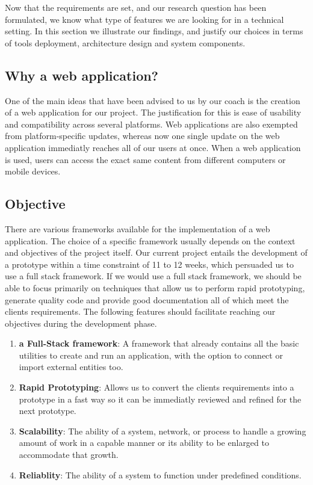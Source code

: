 Now that the requirements are set, and our research question has been formulated, we know what type of features we are looking for in a technical setting. In this section we illustrate our findings, and justify our choices in terms of tools deployment, architecture design and system components.

\subsection{Why a web application?}
One of the main ideas that have been advised to us by our coach is the creation of a web application for our project. The justification for this is ease of usability and compatibility across several platforms. Web applications are also exempted from platform-specific updates, whereas now one single update on the web application immediatly reaches all of our users at once. When a web application is used, users can access the exact same content from different computers or mobile devices.

\subsection{Objective}
There are various frameworks available for the implementation of a web application. The choice of a specific framework usually depends on the context and objectives of the project itself. Our current project entails the development of a prototype within a time constraint of 11 to 12 weeks, which persuaded us to use a full stack framework. If we would use a full stack framework, we should be able to focus primarily on techniques that allow us to perform rapid prototyping, generate quality code and provide good documentation all of which meet the clients requirements. The following features should facilitate reaching our objectives during the development phase.

\begin{enumerate}
	\item \textbf{a Full-Stack framework}: A framework that already contains all the basic utilities to create and run an application, with the option to connect or import external entities too.
	\item \textbf{Rapid Prototyping}: Allows us to convert the clients requirements into a prototype in a fast way so it can be immediatly reviewed and refined for the next prototype.
	\item \textbf{Scalability}: The ability of a system, network, or process to handle a growing amount of work in a capable manner or its ability to be enlarged to accommodate that growth.\cite{wiki:scalability}
	\item \textbf{Reliablity}: The ability of a system to function under predefined conditions.
\end{enumerate}
